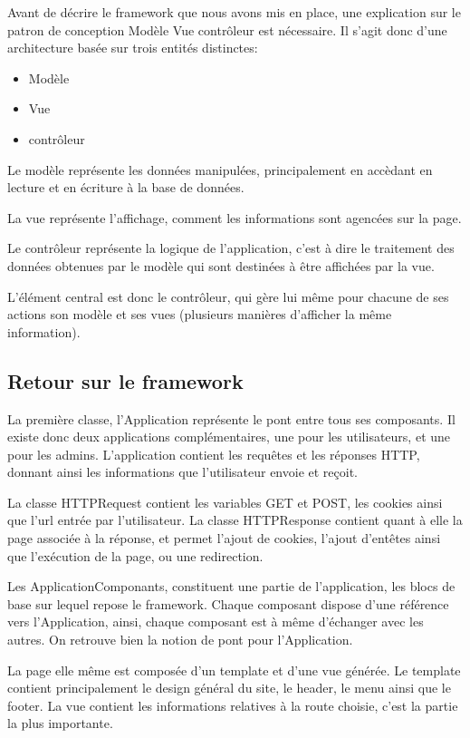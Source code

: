Avant de décrire le framework que nous avons mis en place, une explication sur le patron de conception Modèle Vue contrôleur
est nécessaire. Il s'agit donc d'une architecture basée sur trois entités distinctes:

    \begin{itemize}
    \item Modèle
    \item Vue
    \item contrôleur
    \end{itemize}

Le modèle représente les données manipulées, principalement en accèdant en lecture et en écriture à la base de données.

La vue représente l'affichage, comment les informations sont agencées sur la page.

Le contrôleur représente la logique de l'application, c'est à dire le traitement des données obtenues par le modèle
qui sont destinées à être affichées par la vue.

L'élément central est donc le contrôleur, qui gère lui même pour chacune de ses actions son modèle et ses vues (plusieurs
manières d'afficher la même information).

        \subsection{Retour sur le framework}

La première classe, l'Application représente le pont entre tous ses composants. Il existe donc deux applications complémentaires, une pour les utilisateurs, et une pour les admins.
L'application contient les requêtes et les réponses HTTP, donnant ainsi les informations que l'utilisateur envoie et reçoit.

La classe HTTPRequest contient les variables GET et POST, les cookies ainsi que l'url entrée par l'utilisateur.
La classe HTTPResponse contient quant à elle la page associée à la réponse, et permet l'ajout de cookies, l'ajout d'entêtes
ainsi que l'exécution de la page, ou une redirection.

Les ApplicationComponants, constituent une partie de l'application, les blocs de base sur lequel repose le framework.
Chaque composant dispose d'une référence vers l'Application, ainsi, chaque composant est à même d'échanger avec les autres.
On retrouve bien la notion de pont pour l'Application.

La page elle même est composée d'un template et d'une vue générée.
Le template contient principalement le design général du site, le header, le menu ainsi que le footer.
La vue contient les informations relatives à la route choisie, c'est la partie la plus importante.


